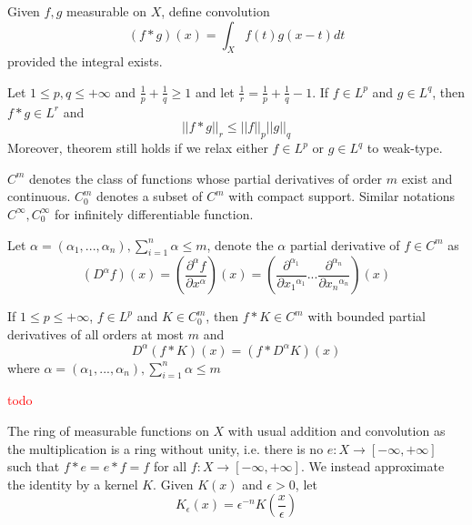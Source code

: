 \documentclass{report}
\begin{document}
\begin{definition}[Convolution]
    Given $f, g$ measurable on $X$, define convolution
    \[
        (f * g)(x) = \int_X f(t) g(x-t) dt
    \]
    provided the integral exists.
\end{definition}

\begin{theorem}
    Let $1 \leq p, q \leq +\infty$ and $\frac{1}{p} + \frac{1}{q} \geq 1$ and let $\frac{1}{r} = \frac{1}{p} + \frac{1}{q} - 1$. If $f \in L^p$ and $g \in L^q$, then $f * g \in L^r$ and 
    \[
        ||f * g||_r \leq ||f||_p ||g||_q
    \]
    Moreover, theorem still holds if we relax either $f \in L^p$ or $g \in L^q$ to weak-type.
\end{theorem}

\begin{definition}
    $C^m$ denotes the class of functions whose partial derivatives of order $m$ exist and continuous. $C^m_0$ denotes a subset of $C^m$ with compact support. Similar notations $C^\infty, C^\infty_0$ for infinitely differentiable function.

    Let $\alpha = (\alpha_1, ..., \alpha_n), \sum_{i=1}^n \alpha \leq m$, denote the $\alpha$ partial derivative of $f \in C^m$ as
    \[
        (D^\alpha f)(x) = \left(\frac{\partial^\alpha f}{\partial x^\alpha} \right)(x) = \left( \frac{\partial^{\alpha_1}}{\partial {x_1}^{\alpha_1}} ... \frac{\partial^{\alpha_n}}{\partial {x_n}^{\alpha_n}}\right)(x)
    \]
\end{definition}

\begin{theorem}
    If $1 \leq p \leq +\infty$, $f \in L^p$ and $K \in C^m_0$, then $f * K \in C^m$ with bounded partial derivatives of all orders at most $m$ and
    \[
        D^\alpha (f * K)(x) = (f * D^\alpha K) (x)
    \]
    where $\alpha = (\alpha_1, ..., \alpha_n), \sum_{i=1}^n \alpha \leq m$
\end{theorem}

\textcolor{red}{todo}




\begin{definition}
The ring of measurable functions on $X$ with usual addition and convolution as the multiplication is a ring without unity, i.e. there is no $e: X \to [-\infty, +\infty]$ such that $f * e = e * f = f$ for all $f: X \to [-\infty, +\infty]$. We instead approximate the identity by a kernel $K$. Given $K(x)$ and $\epsilon > 0$, let
\[
    K_\epsilon(x) = \epsilon^{-n} K\left( \frac{x}{\epsilon} \right)
\]    
\end{definition}
\end{document}
